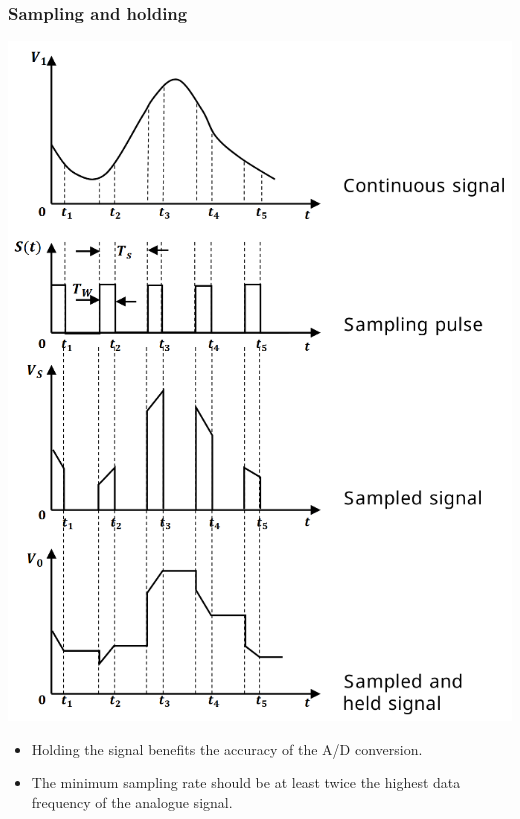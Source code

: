 \documentclass[11pt]{article}
\begin{document}
\subsubsection{Sampling and holding}
\label{sec:org48dd4f6}
\begin{center}
\includegraphics[width=.9\linewidth]{./images/sampling-and-holding-signal-transformation.png}
\end{center}

\begin{itemize}
\item Holding the signal benefits the accuracy of the A/D conversion.
\item The minimum sampling rate should be at least twice the highest data frequency of the analogue signal.
\end{itemize}
\end{document}
